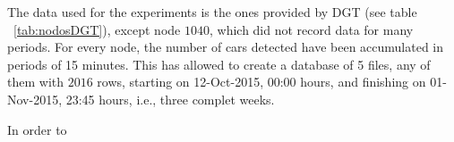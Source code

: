 The data used for the experiments is the ones provided by DGT (see table ~\ref{tab:nodosDGT}), except node $1040$, which did not record data for many periods. For every node, the number of cars detected have been accumulated in periods of 15 minutes. This has allowed to create a database of 5 files, any of them with $2016$ rows, starting on 12-Oct-2015, 00:00 hours, and finishing on 01-Nov-2015, 23:45 hours, i.e., three complet weeks. 

In order to 





